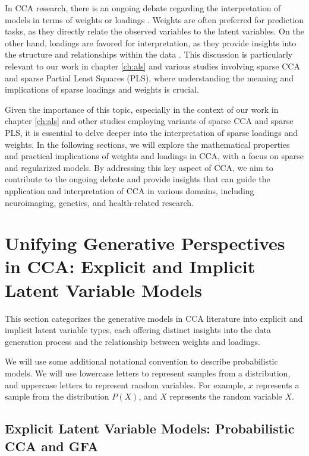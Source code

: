 In CCA research, there is an ongoing debate regarding the interpretation of models in terms of weights or loadings \citep{gu2018simultaneous}. Weights are often preferred for prediction tasks, as they directly relate the observed variables to the latent variables. On the other hand, loadings are favored for interpretation, as they provide insights into the structure and relationships within the data \citep{liu2022improved}. This discussion is particularly relevant to our work in chapter \ref{ch:als} and various studies involving sparse CCA and sparse Partial Least Squares (PLS), where understanding the meaning and implications of sparse loadings and weights is crucial.

Given the importance of this topic, especially in the context of our work in chapter \ref{ch:als} and other studies employing variants of sparse CCA and sparse PLS, it is essential to delve deeper into the interpretation of sparse loadings and weights. In the following sections, we will explore the mathematical properties and practical implications of weights and loadings in CCA, with a focus on sparse and regularized models. By addressing this key aspect of CCA, we aim to contribute to the ongoing debate and provide insights that can guide the application and interpretation of CCA in various domains, including neuroimaging, genetics, and health-related research.

\section{Unifying Generative Perspectives in CCA: Explicit and Implicit Latent Variable Models}

This section categorizes the generative models in CCA literature into explicit and implicit latent variable types, each offering distinct insights into the data generation process and the relationship between weights and loadings.

We will use some additional notational convention to describe probabilistic models.
We will use lowercase letters to represent samples from a distribution, and uppercase letters to represent random variables.
For example, \(x\) represents a sample from the distribution \(P(X)\), and \(X\) represents the random variable \(X\).

\subsection{Explicit Latent Variable Models: Probabilistic CCA and GFA}

